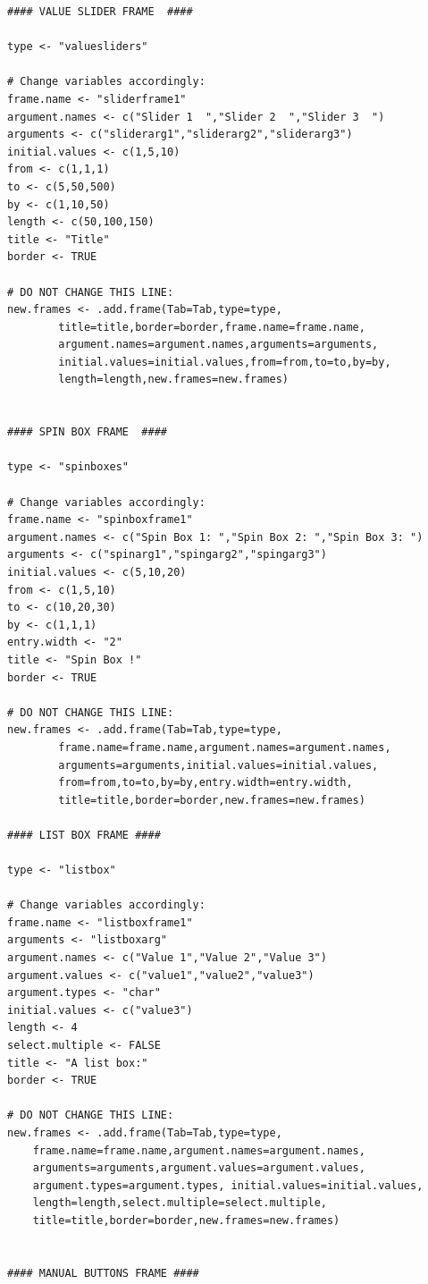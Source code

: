 \documentclass[a4paper]{article}\usepackage[]{graphicx}\usepackage[]{color}
\begin{document}
\begin{verbatim}
#### VALUE SLIDER FRAME  ####

type <- "valuesliders"

# Change variables accordingly:
frame.name <- "sliderframe1"
argument.names <- c("Slider 1  ","Slider 2  ","Slider 3  ")
arguments <- c("sliderarg1","sliderarg2","sliderarg3") 
initial.values <- c(1,5,10)
from <- c(1,1,1) 
to <- c(5,50,500) 
by <- c(1,10,50)  
length <- c(50,100,150) 
title <- "Title"
border <- TRUE

# DO NOT CHANGE THIS LINE:
new.frames <- .add.frame(Tab=Tab,type=type,
        title=title,border=border,frame.name=frame.name,
        argument.names=argument.names,arguments=arguments,
        initial.values=initial.values,from=from,to=to,by=by,
        length=length,new.frames=new.frames)


#### SPIN BOX FRAME  ####

type <- "spinboxes"

# Change variables accordingly:
frame.name <- "spinboxframe1"
argument.names <- c("Spin Box 1: ","Spin Box 2: ","Spin Box 3: ") 
arguments <- c("spinarg1","spingarg2","spingarg3") 
initial.values <- c(5,10,20)
from <- c(1,5,10)  
to <- c(10,20,30)
by <- c(1,1,1)
entry.width <- "2"  
title <- "Spin Box !"
border <- TRUE

# DO NOT CHANGE THIS LINE:
new.frames <- .add.frame(Tab=Tab,type=type,
        frame.name=frame.name,argument.names=argument.names,
        arguments=arguments,initial.values=initial.values,
        from=from,to=to,by=by,entry.width=entry.width,
        title=title,border=border,new.frames=new.frames)

#### LIST BOX FRAME ####
	
type <- "listbox"
	
# Change variables accordingly:
frame.name <- "listboxframe1"
arguments <- "listboxarg"		 
argument.names <- c("Value 1","Value 2","Value 3")
argument.values <- c("value1","value2","value3")
argument.types <- "char"   		  
initial.values <- c("value3")    
length <- 4 
select.multiple <- FALSE
title <- "A list box:"
border <- TRUE
	
# DO NOT CHANGE THIS LINE:
new.frames <- .add.frame(Tab=Tab,type=type,
    frame.name=frame.name,argument.names=argument.names,
    arguments=arguments,argument.values=argument.values,
    argument.types=argument.types, initial.values=initial.values,
    length=length,select.multiple=select.multiple,
    title=title,border=border,new.frames=new.frames)


#### MANUAL BUTTONS FRAME ####


\end{verbatim}
\end{document}
